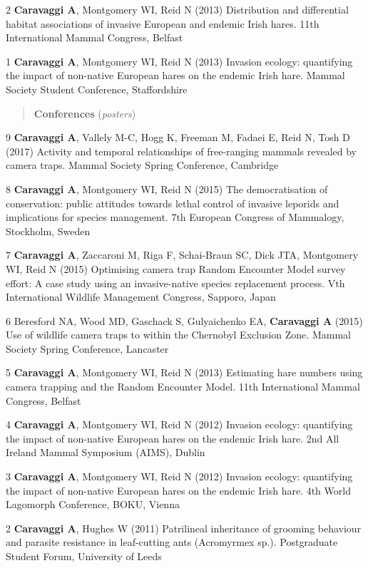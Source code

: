 \documentclass[]{article}
\begin{document}
2 \textbf{Caravaggi A}, Montgomery WI, Reid N (2013) Distribution and
differential habitat associations of invasive European and endemic Irish
hares. 11th International Mammal Congress, Belfast

1 \textbf{Caravaggi A}, Montgomery WI, Reid N (2013) Invasion ecology:
quantifying the impact of non-native European hares on the endemic Irish
hare. Mammal Society Student Conference, Staffordshire

\begin{quote}
\textbf{Conferences} (\emph{posters})
\end{quote}

9 \textbf{Caravaggi A}, Vallely M-C, Hogg K, Freeman M, Fadaei E, Reid
N, Tosh D (2017) Activity and temporal relationships of free-ranging
mammals revealed by camera traps. Mammal Society Spring Conference,
Cambridge

8 \textbf{Caravaggi A}, Montgomery WI, Reid N (2015) The democratisation
of conservation: public attitudes towards lethal control of invasive
leporids and implications for species management. 7th European Congress
of Mammalogy, Stockholm, Sweden

7 \textbf{Caravaggi A}, Zaccaroni M, Riga F, Schai-Braun SC, Dick JTA,
Montgomery WI, Reid N (2015) Optimising camera trap Random Encounter
Model survey effort: A case study using an invasive-native species
replacement process. Vth International Wildlife Management Congress,
Sapporo, Japan

6 Beresford NA, Wood MD, Gaschack S, Gulyaichenko EA, \textbf{Caravaggi
A} (2015) Use of wildlife camera traps to within the Chernobyl Exclusion
Zone. Mammal Society Spring Conference, Lancaster

5 \textbf{Caravaggi A}, Montgomery WI, Reid N (2013) Estimating hare
numbers using camera trapping and the Random Encounter Model. 11th
International Mammal Congress, Belfast

4 \textbf{Caravaggi A}, Montgomery WI, Reid N (2012) Invasion ecology:
quantifying the impact of non-native European hares on the endemic Irish
hare. 2nd All Ireland Mammal Symposium (AIMS), Dublin

3 \textbf{Caravaggi A}, Montgomery WI, Reid N (2012) Invasion ecology:
quantifying the impact of non-native European hares on the endemic Irish
hare. 4th World Lagomorph Conference, BOKU, Vienna

2 \textbf{Caravaggi A}, Hughes W (2011) Patrilineal inheritance of
grooming behaviour and parasite resistance in leaf-cutting ants
(Acromyrmex sp.). Postgraduate Student Forum, University of Leeds
\end{document}
